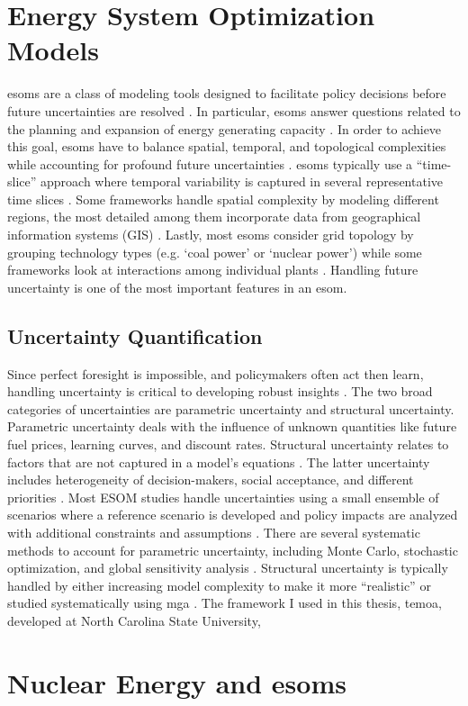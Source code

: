 \section{Energy System Optimization Models}

\glspl{esom} are a class of modeling tools designed to facilitate policy decisions before
future uncertainties are resolved \cite{hunter_modeling_2013}. In particular, \glspl{esom} answer questions
related to the planning and expansion of energy generating capacity \cite{de_queiroz_repurposing_2019}.
In order to achieve this goal, \glspl{esom} have to balance spatial, temporal, and topological
complexities while accounting for profound future uncertainties \cite{martinez-gordon_review_2021}.
\glspl{esom} typically use a “time-slice” approach where temporal variability is captured in
several representative time slices \cite{fattahi_systemic_2020}. Some frameworks
handle spatial complexity by modeling different regions, the most detailed among
them incorporate data from geographical information systems (GIS) \cite{fattahi_systemic_2020}.
Lastly, most \glspl{esom} consider grid topology by grouping technology types (e.g. ‘coal power’
or ‘nuclear power’) \cite{fattahi_systemic_2020} while some frameworks look at
interactions among individual plants \cite{jenkins_enhanced_2017}. Handling
future uncertainty is one of the most important features in an \gls{esom}.

\subsection{Uncertainty Quantification}

Since perfect foresight is impossible, and policymakers often act then learn, handling
uncertainty is critical to developing robust insights
\cite{yue_review_2018, decarolis_modelling_2016}.
The two broad categories of uncertainties are parametric uncertainty and structural
uncertainty. Parametric uncertainty deals with the influence of unknown quantities
like future fuel prices, learning curves, and discount rates. Structural uncertainty
relates to factors that are not captured in a model’s equations
\cite{hunter_modeling_2013, yue_review_2018}.
The latter uncertainty includes heterogeneity of decision-makers,
social acceptance, and different priorities \cite{yue_review_2018}. Most ESOM
studies handle uncertainties using a small ensemble of scenarios where a reference
scenario is developed and policy impacts are analyzed with additional constraints
and assumptions \cite{yue_review_2018}. There are several systematic methods to
account for parametric uncertainty, including Monte Carlo, stochastic optimization,
and global sensitivity analysis \cite{yue_review_2018}. Structural uncertainty
is typically handled by either increasing model complexity to make it more
``realistic'' or studied systematically using \gls{mga}
\cite{hunter_modeling_2013,decarolis_modelling_2016, yue_review_2018}.
The framework I used in this thesis,
\gls{temoa}, developed at North Carolina State University,


\section{Nuclear Energy and \glspl{esom}}
